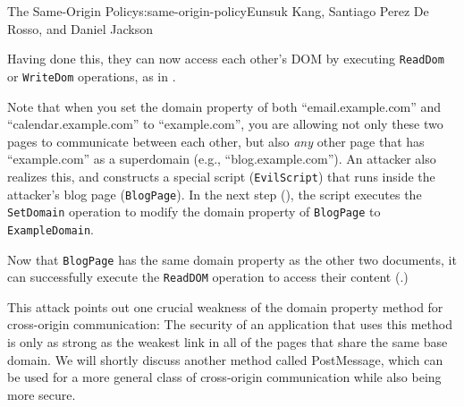 \begin{aosachapter}{The Same-Origin Policy}{s:same-origin-policy}{Eunsuk Kang, Santiago Perez De Rosso, and Daniel Jackson}

Having done this, they can now access each other's DOM by executing
\texttt{ReadDom} or \texttt{WriteDom} operations, as in
.


Note that when you set the domain property of both ``email.example.com''
and ``calendar.example.com'' to ``example.com'', you are allowing not
only these two pages to communicate between each other, but also
\emph{any} other page that has ``example.com'' as a superdomain (e.g.,
``blog.example.com''). An attacker also realizes this, and constructs a
special script (\texttt{EvilScript}) that runs inside the attacker's
blog page (\texttt{BlogPage}). In the next step
(), the script
executes the \texttt{SetDomain} operation to modify the domain property
of \texttt{BlogPage} to \texttt{ExampleDomain}.


Now that \texttt{BlogPage} has the same domain property as the other two
documents, it can successfully execute the \texttt{ReadDOM} operation to
access their content
(.)


This attack points out one crucial weakness of the domain property
method for cross-origin communication: The security of an application
that uses this method is only as strong as the weakest link in all of
the pages that share the same base domain. We will shortly discuss
another method called PostMessage, which can be used for a more general
class of cross-origin communication while also being more secure.

\label{json-with-padding-jsonp}


\end{aosachapter}
